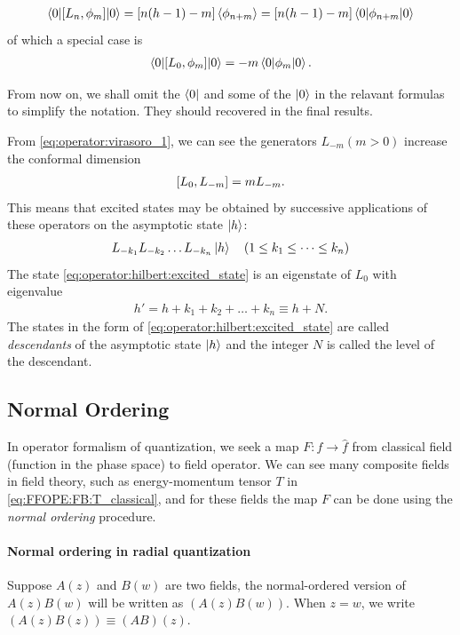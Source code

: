 \documentclass[10pt]{article}
\begin{document}
\begin{align}
    \ev**{\comm{L_n}{\phi_m}}{0}=\left[n(h-1)-m\right]\expval{\phi_{n+m}}=\left[n(h-1)-m\right]\ev**{\phi_{n+m}}{0}
\end{align}
of which a special case is
\begin{align}
    \ev**{\comm{L_0}{\phi_m}}{0}=-m\ev**{\phi_m}{0}.
\end{align}
\begin{notice}
    From now on, we shall omit the $\bra{0}$ and some of the $\ket{0}$ in the relavant formulas to simplify the notation. They should recovered in the final results.
\end{notice}
From \cref{eq:operator:virasoro_1}, we can see the generators $L_{-m}(m>0)$ increase the conformal dimension
\begin{align}
    \comm{L_0}{L_{-m}}=mL_{-m}.
\end{align}
This means that excited states may be obtained by successive applications of these operators on the asymptotic state $\ket{h}$:
\begin{align}
    L_{-k_1}L_{-k_2}\dots L_{-k_n}\ket{h}\quad(1\leq k_1\leq\dots\leq k_n)\label{eq:operator:hilbert:excited_state}
\end{align}
The state \cref{eq:operator:hilbert:excited_state} is an eigenstate of $L_0$ with eigenvalue
\begin{align}
    h'=h+k_1+k_2+\dots+k_n\equiv h+N.
\end{align}
The states in the form of \cref{eq:operator:hilbert:excited_state} are called \textit{descendants} of the asymptotic state $\ket{h}$ and the integer $N$ is called the level of the descendant.


\subsection{Normal Ordering\label{subsec:operator:normal_ordering}}
\begin{intu}
    In operator formalism of quantization, we seek a map $F:f\to\hat{f}$ from classical field (function in the phase space) to field operator.
    We can see many composite fields in field theory, such as energy-momentum tensor $T$ in \cref{eq:FFOPE:FB:T_classical}, and for these fields the map $F$ can be done using the \textit{normal ordering} procedure.
\end{intu}
\paragraph{Normal ordering in radial quantization}
Suppose $A(z)$ and $B(w)$ are two fields, the normal-ordered version of $A(z)B(w)$ will be written as $(A(z)B(w))$.
When $z=w$, we write $(A(z)B(z))\equiv(AB)(z)$.
\end{document}
